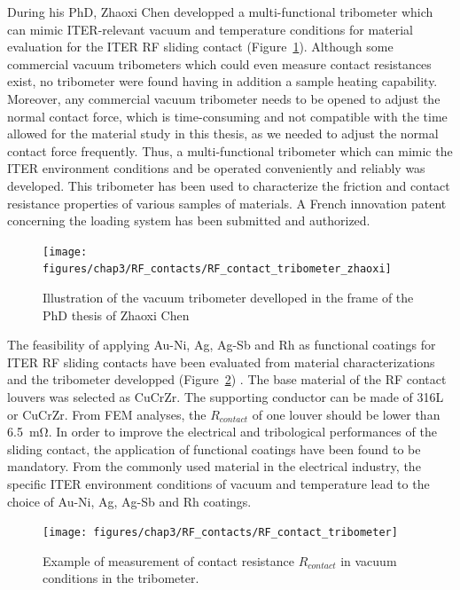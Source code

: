 {During his PhD, Zhaoxi Chen developped a multi-functional tribometer  which can mimic ITER-relevant vacuum and temperature conditions for material evaluation for the ITER RF sliding contact (Figure~\ref{fig:rfcontacttribometerzhaoxi}). Although some commercial vacuum tribometers which could even measure contact resistances exist, no tribometer were found having in addition a sample heating capability. Moreover, any commercial vacuum tribometer needs to be opened to adjust the normal contact force, which is time-consuming and not compatible with the time allowed for the material study in this thesis, as we needed to adjust the normal contact force frequently. Thus, a multi-functional tribometer which can mimic the ITER environment conditions and be operated conveniently and reliably was developed. This tribometer has been used to characterize the friction and contact resistance properties of various samples of materials. A French innovation patent concerning the loading system has been submitted and authorized.   

\begin{figure}[h]
	\centering
	\texttt{[image: figures/chap3/RF\_contacts/RF\_contact\_tribometer\_zhaoxi]}
	\caption{Illustration of the vacuum tribometer develloped in the frame of the PhD thesis of Zhaoxi Chen }
	\label{fig:rfcontacttribometerzhaoxi}
\end{figure}

The feasibility of applying Au-Ni, Ag, Ag-Sb and Rh as functional coatings for ITER RF sliding contacts have been evaluated from material characterizations and the tribometer developped (Figure~\ref{fig:rfcontacttribometerresults}) . The base material of the RF contact louvers was selected as CuCrZr. The supporting conductor can be made of 316L or CuCrZr. From FEM analyses, the $R_{contact}$ of one louver should be lower than 6.5~$\si{\milli\ohm}$. In order to improve the electrical and tribological performances of the sliding contact, the application of functional coatings have been found to be mandatory. From the commonly used material in the electrical industry, the specific ITER environment conditions of vacuum and temperature lead to the choice of Au-Ni, Ag, Ag-Sb and Rh coatings. 

\begin{figure}[h]
	\centering
	\texttt{[image: figures/chap3/RF\_contacts/RF\_contact\_tribometer]}
	\caption{Example of measurement of contact resistance $R_{contact}$ in vacuum conditions in the tribometer. }
	\label{fig:rfcontacttribometerresults}
\end{figure}

}
